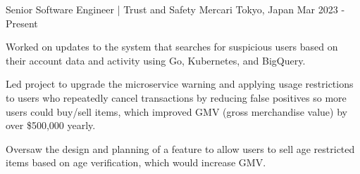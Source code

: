 

\begin{cventries}

    \cventry
    {Senior Software Engineer | Trust and Safety} %
    {Mercari} %
    {Tokyo, Japan} %
    {Mar 2023 - Present} %
    {
        \begin{cvitems} %
            \item {Worked on updates to the system that searches for suspicious users based on their account data and activity using Go, Kubernetes, and BigQuery.}
            \item {Led project to upgrade the microservice warning and applying usage restrictions to users who repeatedly cancel transactions by reducing false positives so more users could buy/sell items, which improved GMV (gross merchandise value) by over \$500,000 yearly.}
            \item {Oversaw the design and planning of a feature to allow users to sell age restricted items based on age verification, which would increase GMV.}
        \end{cvitems}
    }


\end{cventries}
